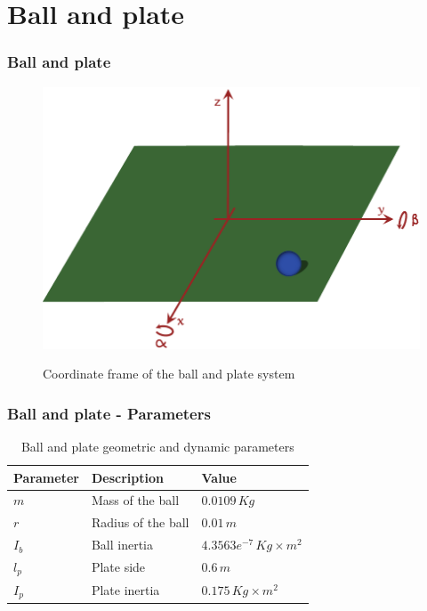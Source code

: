 %
\section{Ball and plate}
%
\begin{frame}
\frametitle{Ball and plate}
%
\begin{figure}
		{\includegraphics[width=.8\linewidth]{img/ballplate.pdf}}
		\caption{Coordinate frame of the ball and plate system}
		\label{fig:BallPlate}
\end{figure}
\end{frame}
%
\begin{frame}
\frametitle{Ball and plate - Parameters}
\begin{table}
\begin{center}
\begin{tabu} to \textwidth { | X[c] | X[c] | X[c] | }
	\hline
	\textbf{Parameter} & \textbf{Description} & \textbf{Value} \\
	\hline
	$m$ & Mass of the ball & $0.0109 \, Kg$ \\
	$r$ & Radius of the ball & $0.01 \, m$ \\
	$I_b$ & Ball inertia & $4.3563e^{-7} \, Kg\times m^2$ \\
	$l_p$ & Plate side & $0.6 \, m$ \\
	$I_p$ & Plate inertia & $0.175 \, Kg\times m^2$ \\
	\hline
\end{tabu}
\caption{Ball and plate geometric and dynamic parameters}
\label{tab:BallPlate_param}
\end{center}
\end{table}
\end{frame}
%
